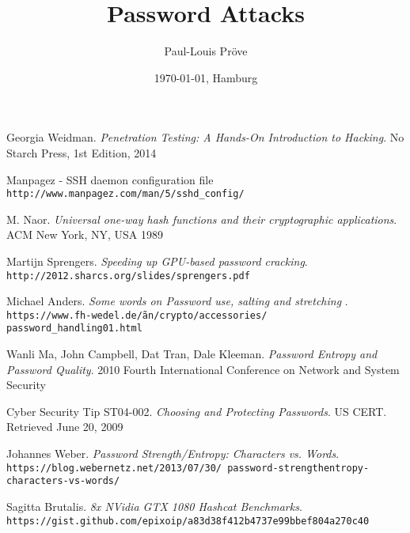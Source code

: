 \documentclass[11pt, a4paper]{article}
\title{Password Attacks}
\author{Paul-Louis Pröve}
\date{\today, Hamburg}
\begin{document}
\maketitle
\newpage

\tableofcontents
\newpage












\begin{thebibliography}{99}

Georgia Weidman.
\textit{Penetration Testing: A Hands-On Introduction to Hacking}.
No Starch Press, 1st Edition, 2014

Manpagez - SSH daemon configuration file
\\\texttt{http://www.manpagez.com/man/5/sshd\_config/}

M. Naor.
\textit{Universal one-way hash functions and their cryptographic applications}.
ACM New York, NY, USA 1989

Martijn Sprengers.
\textit{Speeding up GPU-based password cracking}.
\\\texttt{http://2012.sharcs.org/slides/sprengers.pdf}

Michael Anders.
\textit{Some words on Password use, salting and stretching }.
\\\texttt{https://www.fh-wedel.de/\~an/crypto/accessories/ password\_handling01.html}

Wanli Ma, John Campbell, Dat Tran, Dale Kleeman.
\textit{Password Entropy and Password Quality}.
2010 Fourth International Conference on Network and System Security

Cyber Security Tip ST04-002.
\textit{Choosing and Protecting Passwords}.
US CERT. Retrieved June 20, 2009

Johannes Weber.
\textit{Password Strength/Entropy: Characters vs. Words}.
\\\texttt{https://blog.webernetz.net/2013/07/30/ password-strengthentropy-characters-vs-words/}

Sagitta Brutalis.
\textit{8x NVidia GTX 1080 Hashcat Benchmarks}.
\\\texttt{https://gist.github.com/epixoip/a83d38f412b4737e99bbef804a270c40}


\end{thebibliography}
\end{document}
